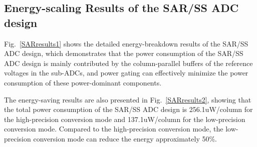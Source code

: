 \subsection{Energy-scaling Results of the SAR/SS ADC design}\label{SAR power}


Fig.~\ref{SARresults1} shows the detailed energy-breakdown results of the SAR/SS ADC design, which 
demonstrates that the power consumption of the SAR/SS ADC design is mainly contributed by the column-parallel buffers of the reference voltages in the sub-ADCs, and power gating can effectively minimize the power consumption of these 
power-dominant components. 

The energy-saving results are also presented in Fig.~\ref{SARresults2}, showing that the total power consumption of the SAR/SS ADC design is 256.1uW/column for the high-precision conversion mode and 137.1uW/column for the low-precision conversion mode. 
Compared to the high-precision conversion mode, the low-precision conversion mode can reduce the energy approximately 50\%.

